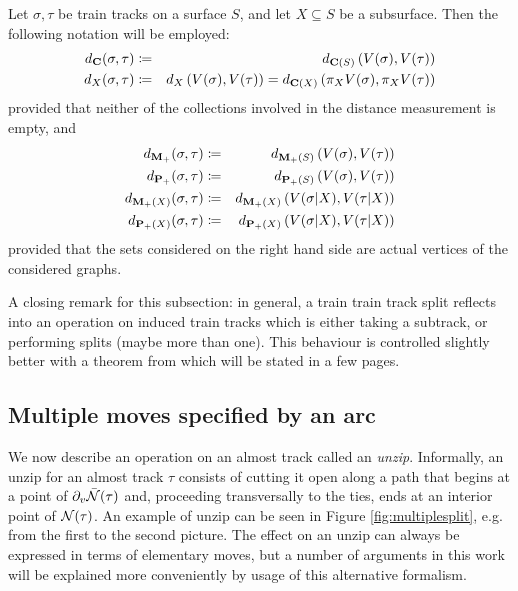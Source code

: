 \begin{defin}
Let $\sigma,\tau$ be train tracks on a surface $S$, and let $X\subseteq S$ be a subsurface. Then the following notation will be employed:
\begin{eqnarray*}
d_{\mathbf C}(\sigma,\tau) & \coloneqq & d_{\mathbf C(S)}\left(V(\sigma),V(\tau)\right) \\
d_{X}(\sigma,\tau) & \coloneqq & d_X\left(V(\sigma),V(\tau)\right) = d_{\mathbf C(X)}\left(\pi_X V(\sigma),\pi_X V(\tau)\right)
\end{eqnarray*}
provided that neither of the collections involved in the distance measurement is empty, and
\begin{eqnarray*}
d_{{\mathbf{M}_+}}(\sigma,\tau) & \coloneqq & d_{{\mathbf{M}_+}(S)}\left(V(\sigma),V(\tau)\right) \\
d_{{\mathbf{P}_+}}(\sigma,\tau) & \coloneqq & d_{{\mathbf{P}_+}(S)}\left(V(\sigma),V(\tau)\right) \\
d_{{\mathbf{M}_+}(X)}(\sigma,\tau) & \coloneqq & d_{{\mathbf{M}_+}(X)}\left(V(\sigma|X),V(\tau|X)\right) \\
d_{{\mathbf{P}_+}(X)}(\sigma,\tau) & \coloneqq & d_{{\mathbf{P}_+}(X)}\left(V(\sigma|X),V(\tau|X)\right)
\end{eqnarray*}
provided that the sets considered on the right hand side are actual vertices of the considered graphs.
\end{defin}

A closing remark for this subsection: in general, a train train track split reflects into an operation on induced train tracks which is either taking a subtrack, or performing splits (maybe more than one). This behaviour is controlled slightly better with a theorem from \cite{mms} which will be stated in a few pages.

\subsection{Multiple moves specified by an arc}
We now describe an operation on an almost track called an \emph{unzip}. Informally, an unzip for an almost track $\tau$ consists of cutting it open along a path that begins at a point of $\partial_v\bar{{\mathcal N}}(\tau)$ and, proceeding transversally to the ties, ends at an interior point of ${\mathcal N}(\tau)$. An example of unzip can be seen in Figure \ref{fig:multiplesplit}, e.g. from the first to the second picture. The effect on an unzip can always be expressed in terms of elementary moves, but a number of arguments in this work will be explained more conveniently by usage of this alternative formalism.

